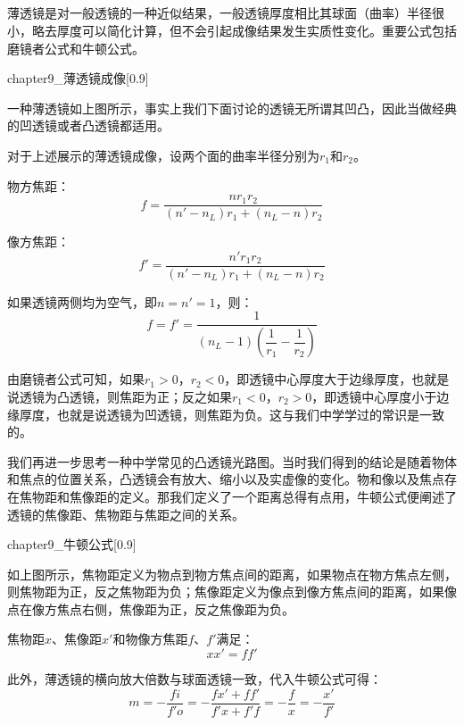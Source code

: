\subsection[透镜成像]{}
薄透镜是对一般透镜的一种近似结果，一般透镜厚度相比其球面（曲率）半径很小，略去厚度可以简化计算，但不会引起成像结果发生实质性变化。重要公式包括磨镜者公式和牛顿公式。
\begin{singlefigure}[薄透镜成像]{chapter9_薄透镜成像}[0.9]
\end{singlefigure}

一种薄透镜如上图所示，事实上我们下面讨论的透镜无所谓其凹凸，因此当做经典的凹透镜或者凸透镜都适用。
\begin{law}
    对于上述展示的薄透镜成像，设两个面的曲率半径分别为$r_1$和$r_2$。

    物方焦距：
    \[f = \dfrac{nr_1 r_2}{(n'-n_L)r_1 + (n_L - n)r_2}\]

    像方焦距：
    \[f' = \dfrac{n'r_1 r_2}{(n'-n_L)r_1 + (n_L - n)r_2}\]

    如果透镜两侧均为空气，即$n = n' = 1$，则：
    \[f = f' = \dfrac{1}{(n_L - 1)(\dfrac{1}{r_1} - \dfrac{1}{r_2})}\]
\end{law}

由磨镜者公式可知，如果$r_1 > 0$，$r_2 < 0$，即透镜中心厚度大于边缘厚度，也就是说透镜为凸透镜，则焦距为正；反之如果$r_1 < 0$，$r_2 > 0$，即透镜中心厚度小于边缘厚度，也就是说透镜为凹透镜，则焦距为负。这与我们中学学过的常识是一致的。

我们再进一步思考一种中学常见的凸透镜光路图。当时我们得到的结论是随着物体和焦点的位置关系，凸透镜会有放大、缩小以及实虚像的变化。物和像以及焦点存在焦物距和焦像距的定义。那我们定义了一个距离总得有点用，牛顿公式便阐述了透镜的焦像距、焦物距与焦距之间的关系。
\begin{singlefigure}[牛顿公式示意图]{chapter9_牛顿公式}[0.9]
\end{singlefigure}

如上图所示，焦物距定义为物点到物方焦点间的距离，如果物点在物方焦点左侧，则焦物距为正，反之焦物距为负；焦像距定义为像点到像方焦点间的距离，如果像点在像方焦点右侧，焦像距为正，反之焦像距为负。
\begin{law}
    焦物距$x$、焦像距$x'$和物像方焦距$f$、$f'$满足：
    \[xx' = ff'\]
\end{law}

此外，薄透镜的横向放大倍数与球面透镜一致，代入牛顿公式可得：
\[m = -\dfrac{fi}{f'o} = -\dfrac{fx'+ff'}{f'x + f'f} = -\dfrac{f}{x} = -\dfrac{x'}{f'}\]

